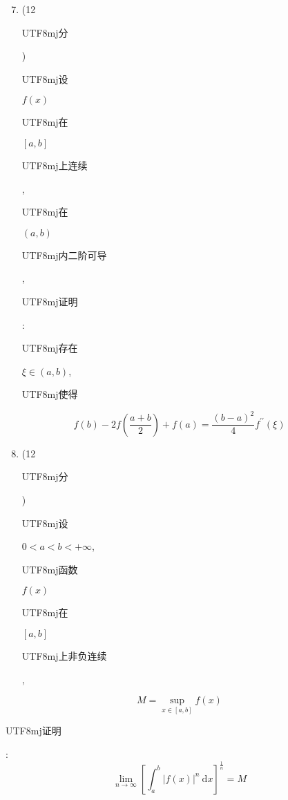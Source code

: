 \documentclass[10pt]{article}
\begin{document}
\begin{enumerate}
  \setcounter{enumi}{6}
  \item (12 \begin{CJK}{UTF8}{mj}分\end{CJK}) \begin{CJK}{UTF8}{mj}设\end{CJK} $f(x)$ \begin{CJK}{UTF8}{mj}在\end{CJK} $[a, b]$ \begin{CJK}{UTF8}{mj}上连续\end{CJK}, \begin{CJK}{UTF8}{mj}在\end{CJK} $(a, b)$ \begin{CJK}{UTF8}{mj}内二阶可导\end{CJK}, \begin{CJK}{UTF8}{mj}证明\end{CJK}: \begin{CJK}{UTF8}{mj}存在\end{CJK} $\xi \in(a, b)$, \begin{CJK}{UTF8}{mj}使得\end{CJK}
\end{enumerate}
$$
f(b)-2 f\left(\frac{a+b}{2}\right)+f(a)=\frac{(b-a)^{2}}{4} f^{\prime \prime}(\xi)
$$

\begin{enumerate}
  \setcounter{enumi}{7}
  \item (12 \begin{CJK}{UTF8}{mj}分\end{CJK}) \begin{CJK}{UTF8}{mj}设\end{CJK} $0<a<b<+\infty$, \begin{CJK}{UTF8}{mj}函数\end{CJK} $f(x)$ \begin{CJK}{UTF8}{mj}在\end{CJK} $[a, b]$ \begin{CJK}{UTF8}{mj}上非负连续\end{CJK},
\end{enumerate}
$$
M=\sup _{x \in[a, b]} f(x)
$$
\begin{CJK}{UTF8}{mj}证明\end{CJK}:
$$
\lim _{n \rightarrow \infty}\left[\int_{a}^{b}|f(x)|^{n} \mathrm{~d} x\right]^{\frac{1}{n}}=M
$$
\end{document}
